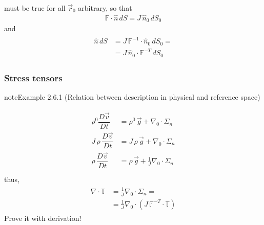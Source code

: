 \documentclass[letterpaper,10pt,english]{jupyterBook}
\begin{document}
\sphinxAtStartPar
must be true for all \(\vec{r}_0\) arbitrary, so that
\begin{equation*}
\begin{split}\mathbb{F} \cdot \hat{n} \, d S = J \, \hat{n}_0 \, d S_0\end{split}
\end{equation*}
\sphinxAtStartPar
and
\begin{equation*}
\begin{split}\begin{aligned}
  \hat{n} \, d S
  & = J \, \mathbb{F}^{-1}  \cdot  \hat{n}_0 \, d S_0 = \\
  & = J \, \hat{n}_0 \cdot \mathbb{F}^{-T} \, d S_0
\end{aligned}\end{split}
\end{equation*}\subsubsection*{Stress tensors}

\sphinxAtStartPar
{}

\sphinxAtStartPar
{}

\sphinxAtStartPar
{}
\label{ch/continuum/balance-reference-integral:example-0}
\begin{sphinxadmonition}{note}{Example 2.6.1 (Relation between description in physical and reference space)}


\begin{equation*}
\begin{split}\begin{aligned}
  \rho^0 \dfrac{D \vec{v}}{D t} & = \rho^0 \, \vec{g} + \nabla_0 \cdot \mathbb{\Sigma}_n \\
  J \, \rho \, \dfrac{D \vec{v}}{D t} & = J \, \rho \, \vec{g} + \nabla_0 \cdot \mathbb{\Sigma}_n \\
  \rho \, \dfrac{D \vec{v}}{D t} & = \rho \, \vec{g} + \frac{1}{J} \nabla_0 \cdot \mathbb{\Sigma}_n \\
\end{aligned}\end{split}
\end{equation*}
\sphinxAtStartPar
thus,
\begin{equation*}
\begin{split}\begin{aligned}
  \nabla \cdot \mathbb{T}
  & = \frac{1}{J} \nabla_0 \cdot \mathbb{\Sigma}_n = \\
  & = \frac{1}{J} \nabla_0 \cdot \left( J \, \mathbb{F}^{-T} \cdot \mathbb{T}  \right) 
\end{aligned}\end{split}
\end{equation*}
\sphinxAtStartPar
{} Prove it with derivation!
\end{sphinxadmonition}
\end{document}
